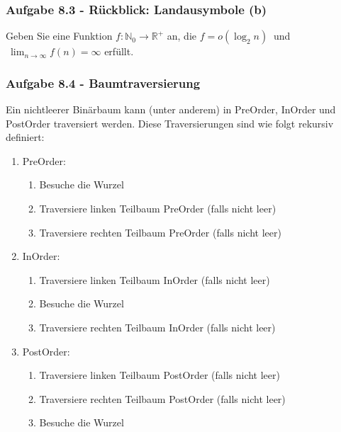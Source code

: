 \documentclass{beamer}
\begin{document}
\begin{frame}[t]
	\frametitle{Aufgabe 8.3 - Rückblick: Landausymbole (b)}
	Geben Sie eine Funktion $f : \mathbb{N}_0 \to \mathbb{R}^+$ an, die $f = o(\log_2{n})\ $ und $\ \lim_{n \to \infty} f(n) = \infty$ erfüllt.
\end{frame}

\begin{frame}
	\frametitle{Aufgabe 8.4 - Baumtraversierung}
	\small
	Ein nichtleerer Binärbaum kann (unter anderem) in PreOrder, InOrder und PostOrder traversiert werden. Diese Traversierungen sind wie folgt rekursiv definiert:

	\begin{enumerate}
		\item PreOrder: \\
		      \begin{enumerate}[a]
			      \item Besuche die Wurzel
			      \item Traversiere linken Teilbaum PreOrder (falls nicht leer)
			      \item Traversiere rechten Teilbaum PreOrder (falls nicht leer)
		      \end{enumerate}
		\item InOrder: \\
		      \begin{enumerate}[a]
			      \item Traversiere linken Teilbaum InOrder (falls nicht leer)
			      \item Besuche die Wurzel
			      \item Traversiere rechten Teilbaum InOrder (falls nicht leer)
		      \end{enumerate}
		\item PostOrder: \\
		      \begin{enumerate}[a]
			      \item Traversiere linken Teilbaum PostOrder (falls nicht leer)
			      \item Traversiere rechten Teilbaum PostOrder (falls nicht leer)
			      \item Besuche die Wurzel
		      \end{enumerate}
	\end{enumerate}
\end{frame}
\end{document}
